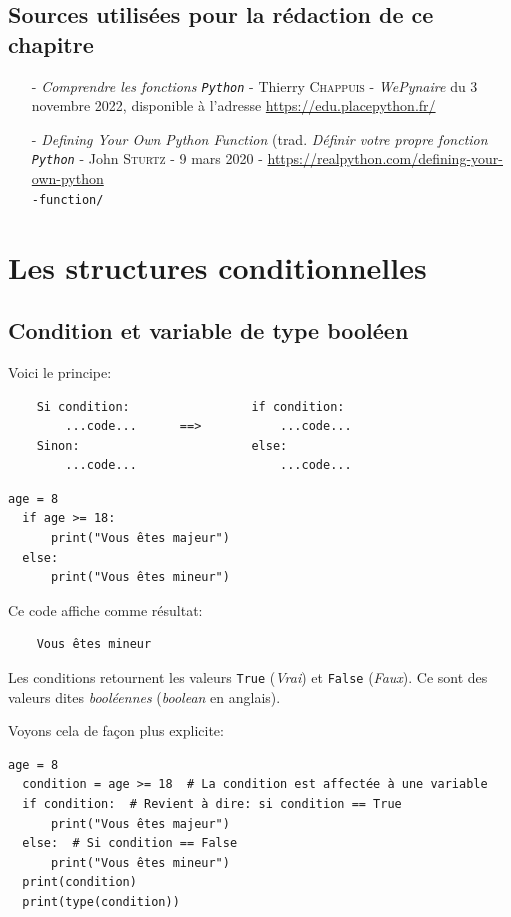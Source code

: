 \documentclass[a4paper,11pt]{book}
\begin{document}
\section*{Sources utilisées pour la rédaction de ce chapitre}
\begin{itemize}
	\item[-] \textit{Comprendre les fonctions \texttt{Python}} - Thierry \textsc{Chappuis} - \textit{WePynaire} du 3 novembre 2022, disponible à l'adresse \url{https://edu.placepython.fr/}
	\item[-] \textit{Defining Your Own Python Function} (trad. \textit{Définir votre propre fonction \texttt{Python}} - John \textsc{Sturtz} - 9 mars 2020 - \url{https://realpython.com/defining-your-own-python}\\ \texttt{-function/} 
\end{itemize}
\medskip

\chapter{Les structures conditionnelles}\label{struct_cond}
\section{Condition et variable de type \og booléen\fg}
Voici le principe:
\begin{verbatim}
    Si condition:                 if condition:
        ...code...      ==>           ...code...
    Sinon:                        else:
        ...code...                    ...code...
\end{verbatim}
\medskip

\begin{lstlisting}[caption=Un premier exemple de structure conditionnelle]
  age = 8
  if age >= 18:
  	  print("Vous êtes majeur")
  else:
  	  print("Vous êtes mineur")
\end{lstlisting}
\medskip

Ce code affiche comme résultat:
\begin{verbatim}
    Vous êtes mineur
\end{verbatim}
\medskip

Les conditions retournent les valeurs \texttt{True} (\textit{Vrai}) et \texttt{False} (\textit{Faux}). Ce sont des valeurs dites \textit{booléennes} (\textit{boolean} en anglais).
\medskip

Voyons cela de façon plus explicite:
\begin{lstlisting}[caption=Les valeurs \textit{booléennes}]
  age = 8
  condition = age >= 18  # La condition est affectée à une variable
  if condition:  # Revient à dire: si condition == True
  	  print("Vous êtes majeur")
  else:  # Si condition == False
  	  print("Vous êtes mineur")
  print(condition)
  print(type(condition))
\end{lstlisting}
\medskip
\end{document}
